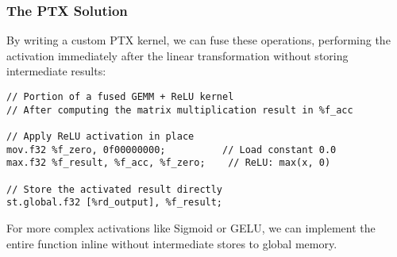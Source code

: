 \subsubsection{The PTX Solution}

By writing a custom PTX kernel, we can fuse these operations, performing the activation immediately after the linear transformation without storing intermediate results:

\begin{lstlisting}[style=ptx]
// Portion of a fused GEMM + ReLU kernel
// After computing the matrix multiplication result in %f_acc

// Apply ReLU activation in place
mov.f32 %f_zero, 0f00000000;          // Load constant 0.0
max.f32 %f_result, %f_acc, %f_zero;    // ReLU: max(x, 0)

// Store the activated result directly
st.global.f32 [%rd_output], %f_result;
\end{lstlisting}

For more complex activations like Sigmoid or GELU, we can implement the entire function inline without intermediate stores to global memory.

